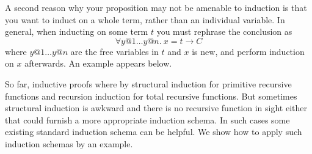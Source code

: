 \begin{isabellebody}
\begin{isamarkuptext}
A second reason why your proposition may not be amenable to induction is that
you want to induct on a whole term, rather than an individual variable. In
general, when inducting on some term $t$ you must rephrase the conclusion as
\[ \forall y@1 \dots y@n.~ x = t \longrightarrow C \] where $y@1 \dots y@n$
are the free variables in $t$ and $x$ is new, and perform induction on $x$
afterwards. An example appears below.%
\end{isamarkuptext}%
%
%
\begin{isamarkuptext}%
So far, inductive proofs where by structural induction for
primitive recursive functions and recursion induction for total recursive
functions. But sometimes structural induction is awkward and there is no
recursive function in sight either that could furnish a more appropriate
induction schema. In such cases some existing standard induction schema can
be helpful. We show how to apply such induction schemas by an example.


\end{isamarkuptext}
\end{isabellebody}
